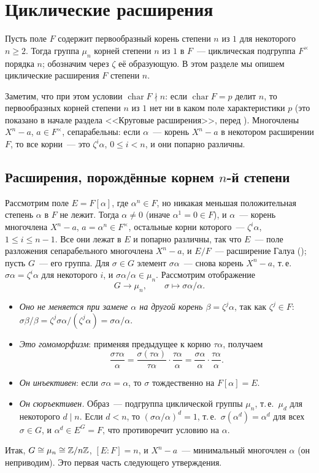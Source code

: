 \section{Циклические расширения}

Пусть поле $F$ содержит первообразный корень степени $n$ из $1$ для некоторого $n\ge2$. Тогда группа $\mu_n$ корней
степени $n$ из $1$ в $F$~--- циклическая подгруппа $F^\times$ порядка $n$; обозначим через $\zeta$ её образующую. В этом
разделе мы опишем циклические расширения $F$ степени $n$.

Заметим, что при этом условии $\operatorname{char}F\nmid n$: если $\operatorname{char}F=p$ делит $n$, то первообразных
корней степени $n$ из $1$ нет ни в каком поле характеристики $p$ (это показано в начале раздела <<Круговые
расширения>>, перед ). Многочлены $X^n-a$, $a\in F^\times$, сепарабельны: если $\alpha$~--- корень $X^n-a$ в
некотором расширении $F$, то все корни~--- это $\zeta^i\alpha$, $0\le i<n$, и они попарно различны.

\subsection*{Расширения, порождённые корнем $n$-й степени}

Рассмотрим поле $E=F[\alpha]$, где $\alpha^n\in F$, но никакая меньшая положительная степень $\alpha$ в $F$ не лежит.
Тогда $\alpha\ne0$ (иначе $\alpha^1=0\in F$), и $\alpha$~--- корень многочлена $X^n-a$, $a=\alpha^n\in F^\times$, остальные
корни которого~--- $\zeta^i\alpha$, $1\le i\le n-1$. Все они лежат в $E$ и попарно различны, так что $E$~--- поле разложения
сепарабельного многочлена $X^n-a$, и $E/F$~--- расширение Галуа (); пусть $G$~--- его группа. Для $\sigma\in G$
элемент $\sigma\alpha$~--- снова корень $X^n-a$, т.\,е.\ $\sigma\alpha=\zeta^i\alpha$ для некоторого $i$, и
$\sigma\alpha/\alpha\in\mu_n$. Рассмотрим отображение
\[
G\to\mu_n,\qquad \sigma\mapsto\sigma\alpha/\alpha.
\]
\begin{itemize}[leftmargin=*]
\item \emph{Оно не меняется при замене $\alpha$ на другой корень $\beta=\zeta^j\alpha$}, так как $\zeta^j\in F$:
$\sigma\beta/\beta=\zeta^j\sigma\alpha/(\zeta^j\alpha)=\sigma\alpha/\alpha$.
\item \emph{Это гомоморфизм}: применяя предыдущее к корню $\tau\alpha$, получаем
\[
\frac{\sigma\tau\alpha}{\alpha}=\frac{\sigma(\tau\alpha)}{\tau\alpha}\cdot\frac{\tau\alpha}{\alpha}
=\frac{\sigma\alpha}{\alpha}\cdot\frac{\tau\alpha}{\alpha}.
\]
\item \emph{Он инъективен}: если $\sigma\alpha=\alpha$, то $\sigma$ тождественно на $F[\alpha]=E$.
\item \emph{Он сюръективен.} Образ~--- подгруппа циклической группы $\mu_n$, т.\,е.\ $\mu_d$ для некоторого $d\mid n$. Если
$d<n$, то $(\sigma\alpha/\alpha)^d=1$, т.\,е.\ $\sigma(\alpha^d)=\alpha^d$ для всех $\sigma\in G$, и $\alpha^d\in E^G=F$,
что противоречит условию на $\alpha$.
\end{itemize}
Итак, $G\cong\mu_n\cong\mathbb Z/n\mathbb Z$, $[E:F]=n$, и $X^n-a$~--- минимальный многочлен $\alpha$ (он неприводим). Это первая
часть следующего утверждения.


